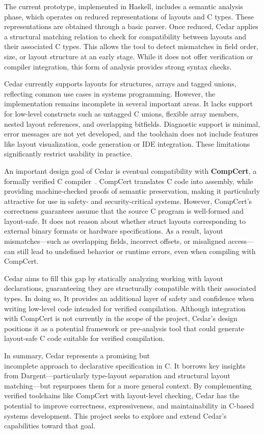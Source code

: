 \documentclass[12pt]{article}
\begin{document}
The current prototype, implemented in Haskell, includes a semantic analysis
phase, which operates on reduced representations of layouts and C types.
These representations are obtained through a basic parser. Once reduced, Cedar
applies a structural matching relation to check for compatibility
between layouts and their associated C types. This allows the tool
to detect mismatches in field order, size, or layout structure at an early 
stage. While it does not offer verification or compiler integration, this form
of analysis provides strong syntax checks.

Cedar currently supports layouts for structures, arrays and tagged unions,
reflecting common use cases in systems programming. However, the implementation
remains incomplete in several important areas. It lacks support for low-level
constructs such as untagged C unions, flexible array members, nested
layout references, and overlapping bitfields. Diagnostic support is minimal,
error messages are not yet developed, and the toolchain does not include features
like layout visualization, code generation or IDE integration. These limitations 
significantly restrict usability in practice.

An important design goal of Cedar is eventual compatibility with
\textbf{CompCert}, a formally verified C compiler~\autocite{compcert}. CompCert translates C code
into assembly, while providing machine-checked proofs of semantic preservation,
making it particularly attractive for use in safety- and security-critical
systems. However, CompCert's correctness guarantees assume that the source
C program is well-formed and layout-safe. It does not reason about whether
struct layouts corresponding to external binary formats or hardware specifications.
As a result, layout mismatches---such as overlapping fields, incorrect offsets,
or misaligned access---can still lead to undefined behavior or runtime errors,
even when compiling with CompCert.

Cedar aims to fill this gap by statically analyzing working with
layout declarations, guaranteeing they are structurally compatible with their
associated types. In doing so, It provides an additional layer of safety and
confidence when writing low-level code intended for verified compilation.
Although integration with CompCert is not currently in the scope of the project,
Cedar's design positions it as a potential framework or pre-analysis tool that
could generate layout-safe C code suitable for verified compilation.

In summary, Cedar represents a promising but\\ incomplete approach to declarative
specification in C. It borrows key insights from Dargent---particularly 
type-layout separation and structural layout matching---but repurposes them for
a more general context. By complementing verified toolchains like
CompCert with layout-level checking, Cedar has the potential to improve
correctness, expressiveness, and maintainability in C-based systems development.
This project seeks to explore and extend Cedar's capabilities toward that goal.
\end{document}
